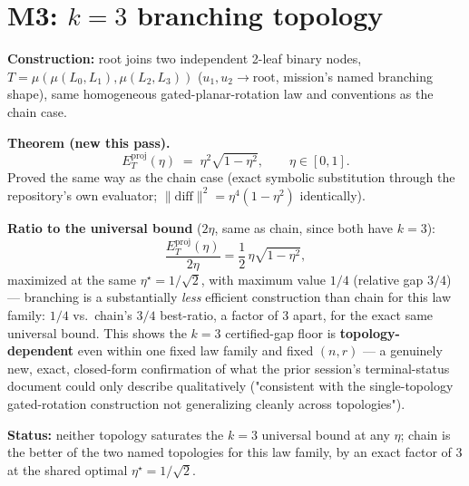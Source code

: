 \section*{M3: $k=3$ branching topology}

\textbf{Construction:} root joins two independent 2-leaf binary nodes,
$T = \mu(\mu(L_0,L_1), \mu(L_2,L_3))$ ($u_1,u_2 \to \text{root}$, mission's
named branching shape), same homogeneous gated-planar-rotation law and
conventions as the chain case.

\textbf{Theorem (new this pass).}
\[
  E_T^{\mathrm{proj}}(\eta) \;=\; \eta^2\sqrt{1-\eta^2}, \qquad \eta\in[0,1].
\]
Proved the same way as the chain case (exact symbolic substitution
through the repository's own evaluator; $\|\text{diff}\|^2 =
\eta^4(1-\eta^2)$ identically).

\textbf{Ratio to the universal bound} ($2\eta$, same as chain, since both
have $k=3$):
\[
  \frac{E_T^{\mathrm{proj}}(\eta)}{2\eta} = \frac12\,\eta\sqrt{1-\eta^2},
\]
maximized at the same $\eta^\star=1/\sqrt2$, with maximum value
$\boxed{1/4}$ (relative gap $3/4$) — branching is a substantially
\emph{less} efficient construction than chain for this law family:
$1/4$ vs.\ chain's $3/4$ best-ratio, a factor of 3 apart, for the exact
same universal bound. This shows the $k=3$ certified-gap floor is
\textbf{topology-dependent} even within one fixed law family and fixed
$(n,r)$ — a genuinely new, exact, closed-form confirmation of what the
prior session's terminal-status document could only describe
qualitatively ("consistent with the single-topology gated-rotation
construction not generalizing cleanly across topologies").

\textbf{Status:} neither topology saturates the $k=3$ universal bound at
any $\eta$; chain is the better of the two named topologies for this law
family, by an exact factor of 3 at the shared optimal $\eta^\star=1/\sqrt2$.
